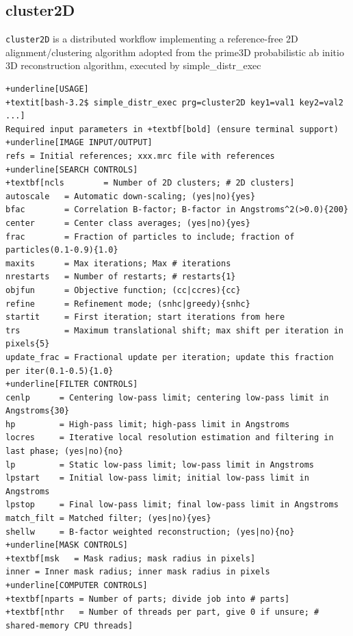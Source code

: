\documentclass[a4paper,11pt]{article}
\newcommand{\prgname}[1]{\textcolor{NavyBlue}{\texttt{#1}}}
\begin{document}
\subsection{cluster2D}
\label{cluster2D}
\prgname{cluster2D} is a distributed workflow implementing a reference-free 2D alignment/clustering algorithm adopted from the prime3D probabilistic ab initio 3D reconstruction algorithm, executed by simple\_distr\_exec
\begin{Verbatim}[commandchars=+\[\],fontsize=\small,breaklines=true]
+underline[USAGE]
+textit[bash-3.2$ simple_distr_exec prg=cluster2D key1=val1 key2=val2 ...]
Required input parameters in +textbf[bold] (ensure terminal support)
+underline[IMAGE INPUT/OUTPUT]
refs = Initial references; xxx.mrc file with references
+underline[SEARCH CONTROLS]
+textbf[ncls        = Number of 2D clusters; # 2D clusters]
autoscale   = Automatic down-scaling; (yes|no){yes}
bfac        = Correlation B-factor; B-factor in Angstroms^2(>0.0){200}
center      = Center class averages; (yes|no){yes}
frac        = Fraction of particles to include; fraction of particles(0.1-0.9){1.0}
maxits      = Max iterations; Max # iterations
nrestarts   = Number of restarts; # restarts{1}
objfun      = Objective function; (cc|ccres){cc}
refine      = Refinement mode; (snhc|greedy){snhc}
startit     = First iteration; start iterations from here
trs         = Maximum translational shift; max shift per iteration in pixels{5}
update_frac = Fractional update per iteration; update this fraction per iter(0.1-0.5){1.0}
+underline[FILTER CONTROLS]
cenlp      = Centering low-pass limit; centering low-pass limit in Angstroms{30}
hp         = High-pass limit; high-pass limit in Angstroms
locres     = Iterative local resolution estimation and filtering in last phase; (yes|no){no}
lp         = Static low-pass limit; low-pass limit in Angstroms
lpstart    = Initial low-pass limit; initial low-pass limit in Angstroms
lpstop     = Final low-pass limit; final low-pass limit in Angstroms
match_filt = Matched filter; (yes|no){yes}
shellw     = B-factor weighted reconstruction; (yes|no){no}
+underline[MASK CONTROLS]
+textbf[msk   = Mask radius; mask radius in pixels]
inner = Inner mask radius; inner mask radius in pixels
+underline[COMPUTER CONTROLS]
+textbf[nparts = Number of parts; divide job into # parts]
+textbf[nthr   = Number of threads per part, give 0 if unsure; # shared-memory CPU threads]
\end{Verbatim}
\end{document}
